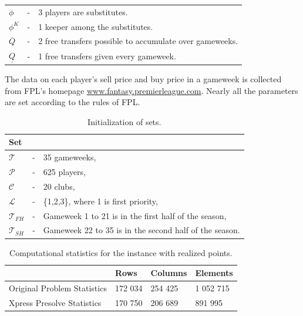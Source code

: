 \begin{table}[H]
\begin{tabular}{@{}lll@{}}
$\phi$                         & - & 3 players are substitutes.                                                         \\
$\phi^{K}$                   & - & 1 keeper among the substitutes.                                                          \\
$\overline{Q}$                   & - & 2 free transfers possible to accumulate over gameweeks.                                              \\
$\underline{Q}$                  & - & 1 free transfers given every gameweek.                                      \\ \bottomrule
\end{tabular}
\end{table}

The data on each player's sell price and buy price in a gameweek is collected from FPL's homepage \url{www.fantasy.premierleague.com}.
Nearly all the parameters are set according to the rules of FPL. 
\begin{table}[H]
\centering
\caption{Initialization of sets.}
\begin{tabular}{@{}lll@{}}
\toprule
Set           &   &                                                               \\ \midrule
$\mathcal{T}$ & - & 35 gameweeks,                                             \\
$\mathcal{P}$ & - & 625 players,                                               \\
$\mathcal{C}$ & - & 20 clubs,                                                 \\
$\mathcal{L}$ & - & \{1,2,3\}, where 1 is first priority, \\
$\mathcal{T}_{FH}$ & - & Gameweek 1 to 21 is in the first half of the season,\\
$\mathcal{T}_{SH}$ & - & Gameweek 22 to 35 is in the second half of the season.\\
\bottomrule
\end{tabular}
\end{table}


\begin{table}[H]
\centering
\caption{Computational statistics for the instance with realized points.}
\label{Computational statistics}
\begin{tabular}{@{}llll@{}}
\toprule
                            & Rows    & Columns & Elements \\ \midrule
Original Problem Statistics & 172 034 & 254 425  & 1 052 715  \\
Xpress Presolve Statistics  & 170 750 & 206 689  & 891 995   \\ \bottomrule
\end{tabular}
\end{table}



